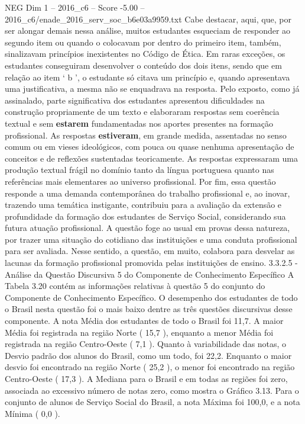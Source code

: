 \begin{textsample}{NEG Dim 1 – 2016\_c6 – Score -5.00 – 2016\_c6/enade\_2016\_serv\_soc\_b6e03a9959.txt}
Cabe destacar, aqui, que, por ser alongar demais nessa análise, muitos estudantes esqueciam de responder ao segundo item ou quando o colocavam por dentro do primeiro item, também, sinalizavam princípios inexistentes no Código de Ética.
Em raras exceções, os estudantes conseguiram desenvolver o conteúdo dos dois itens, sendo que em relação ao item ‘ b ’, o estudante só citava um princípio e, quando apresentava uma justificativa, a mesma não se enquadrava na resposta.
Pelo exposto, como já assinalado, parte significativa dos estudantes apresentou dificuldades na construção propriamente de um texto e elaboraram respostas sem coerência textual e sem \textbf{estarem} fundamentadas nos aportes presentes na formação profissional.
As respostas \textbf{estiveram}, em grande medida, assentadas no senso comum ou em vieses ideológicos, com pouca ou quase nenhuma apresentação de conceitos e de reflexões sustentadas teoricamente.
As respostas expressaram uma produção textual frágil no domínio tanto da língua portuguesa quanto nas referências mais elementares ao universo profissional.
Por fim, essa questão responde a uma demanda contemporânea do trabalho profissional e, ao inovar, trazendo uma temática instigante, contribuiu para a avaliação da extensão e profundidade da formação dos estudantes de Serviço Social, considerando sua futura atuação profissional.
A questão foge ao usual em provas dessa natureza, por trazer uma situação do cotidiano das instituições e uma conduta profissional para ser avaliada.
Nesse sentido, a questão, em muito, colabora para desvelar as lacunas da formação profissional promovida pelas instituições de ensino. 3.3.2.5 - Análise da Questão Discursiva 5 do Componente de Conhecimento Específico A Tabela 3.20 contém as informações relativas à questão 5 do conjunto do Componente de Conhecimento Específico.
O desempenho dos estudantes de todo o Brasil nesta questão foi o mais baixo dentre as três questões discursivas desse componente.
A nota Média dos estudantes de todo o Brasil foi 11,7.
A maior Média foi registrada na região Norte ( 15,7 ), enquanto a menor Média foi registrada na região Centro-Oeste ( 7,1 ).
Quanto à variabilidade das notas, o Desvio padrão dos alunos do Brasil, como um todo, foi 22,2.
Enquanto o maior desvio foi encontrado na região Norte ( 25,2 ), o menor foi encontrado na região Centro-Oeste ( 17,3 ).
A Mediana para o Brasil e em todas as regiões foi zero, associada ao excessivo número de notas zero, como mostra o Gráfico 3.13.
Para o conjunto de alunos de Serviço Social do Brasil, a nota Máxima foi 100,0, e a nota Mínima ( 0,0 ).

\end{textsample}
